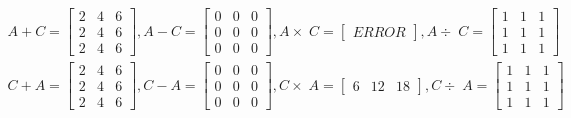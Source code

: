 \documentclass[UTF8,a4paper,notitlepage,openany,plain,final]{ctexbook}
\begin{document}
    \[ \begin{split}
        A + C =
        \begin{bmatrix}
            2 & 4 & 6 \\
            2 & 4 & 6 \\
            2 & 4 & 6
        \end{bmatrix}
        , A - C =
        \begin{bmatrix}
            0 & 0 & 0 \\
            0 & 0 & 0 \\
            0 & 0 & 0
        \end{bmatrix}
        , A \times\; C =
        \begin{bmatrix}
            ERROR
        \end{bmatrix}
        , A \div\; C =
        \begin{bmatrix}
            1 & 1 & 1 \\
            1 & 1 & 1 \\
            1 & 1 & 1
        \end{bmatrix}
        \\
        C + A =
        \begin{bmatrix}
            2 & 4 & 6 \\
            2 & 4 & 6 \\
            2 & 4 & 6
        \end{bmatrix}
        , C - A =
        \begin{bmatrix}
            0 & 0 & 0 \\
            0 & 0 & 0 \\
            0 & 0 & 0
        \end{bmatrix}
        , C \times\; A =
        \begin{bmatrix}
            6 & 12 & 18
        \end{bmatrix}
        , C \div\; A =
        \begin{bmatrix}
            1 & 1 & 1 \\
            1 & 1 & 1 \\
            1 & 1 & 1
        \end{bmatrix}
    \end{split} \]
\end{document}
